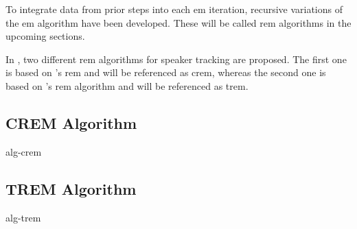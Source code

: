 To integrate data from prior steps into each \gls{em} iteration, recursive variations of the \gls{em} algorithm have been developed. These will be called \gls{rem} algorithms in the upcoming sections.

In \cite{Schwartz2014}, two different \gls{rem} algorithms for speaker tracking are proposed. The first one is based on \citeauthor{Cappe2009}'s \gls{rem} and will be referenced as \acrshort{crem}, whereas the second one is based on \citeauthor{Titterington1984}'s \gls{rem} algorithm and will be referenced as \acrshort{trem}.

\subsection{CREM Algorithm}
\label{sec:crem}
{alg-crem}

\subsection{TREM Algorithm}
\label{sec:trem}
{alg-trem}
